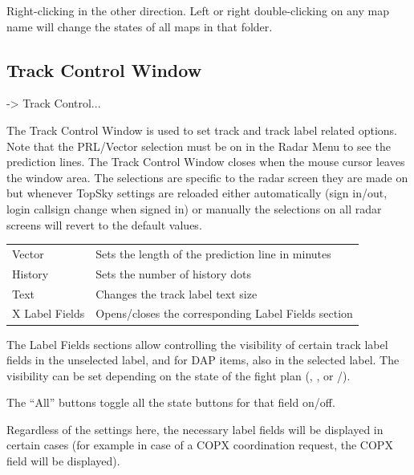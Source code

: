 \documentclass[a4paper,oneside,11pt]{memoir}
\begin{document}
\bigskip

Right-clicking in the other direction. Left or right double-clicking on any map name will change the states of all maps in that folder.

\subsection{Track Control Window}
\label{win:tcw}

 -> Track Control...

\bigskip

The Track Control Window is used to set track and track label related options. Note that the PRL/Vector selection must be on in the Radar Menu to see the prediction lines. The Track Control Window closes when the mouse cursor leaves the window area. The selections are specific to the radar screen they are made on but whenever TopSky settings are reloaded either automatically (sign in/out, login callsign change when signed in) or manually the selections on all radar screens will revert to the default values.


\begin{longtable}{p{2.5cm} p{10cm}}
    Vector          & Sets the length of the prediction line in minutes\\
    History         & Sets the number of history dots\\
    Text            & Changes the track label text size\\
    X Label Fields  & Opens/closes the corresponding Label Fields section\\
\end{longtable}

\bigskip

The Label Fields sections allow controlling the visibility of certain track label fields in the unselected label, and for DAP items, also in the selected label. The visibility can be set depending on the state of the fight plan (, ,  or /).

\bigskip

The “All” buttons toggle all the state buttons for that field on/off.

\bigskip

Regardless of the settings here, the necessary label fields will be displayed in certain cases (for example in case of a COPX coordination request, the COPX field will be displayed).
\end{document}
